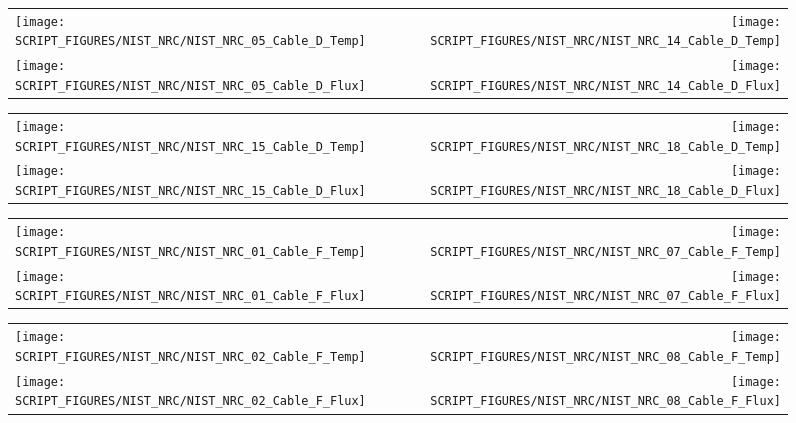 \begin{figure}[p]
\begin{tabular*}{\textwidth}{l@{\extracolsep{\fill}}r}
\texttt{[image: SCRIPT\_FIGURES/NIST\_NRC/NIST\_NRC\_05\_Cable\_D\_Temp]} &
\texttt{[image: SCRIPT\_FIGURES/NIST\_NRC/NIST\_NRC\_14\_Cable\_D\_Temp]} \\
\texttt{[image: SCRIPT\_FIGURES/NIST\_NRC/NIST\_NRC\_05\_Cable\_D\_Flux]} &
\texttt{[image: SCRIPT\_FIGURES/NIST\_NRC/NIST\_NRC\_14\_Cable\_D\_Flux]}
\end{tabular*}
\label{NIST_NRC_D_5_and_14}
\end{figure}

\clearpage

\begin{figure}[p]
\begin{tabular*}{\textwidth}{l@{\extracolsep{\fill}}r}
\texttt{[image: SCRIPT\_FIGURES/NIST\_NRC/NIST\_NRC\_15\_Cable\_D\_Temp]} &
\texttt{[image: SCRIPT\_FIGURES/NIST\_NRC/NIST\_NRC\_18\_Cable\_D\_Temp]} \\
\texttt{[image: SCRIPT\_FIGURES/NIST\_NRC/NIST\_NRC\_15\_Cable\_D\_Flux]} &
\texttt{[image: SCRIPT\_FIGURES/NIST\_NRC/NIST\_NRC\_18\_Cable\_D\_Flux]}
\end{tabular*}
\label{NIST_NRC_D_15_and_18}
\end{figure}

\clearpage

\begin{figure}[p]
\begin{tabular*}{\textwidth}{l@{\extracolsep{\fill}}r}
\texttt{[image: SCRIPT\_FIGURES/NIST\_NRC/NIST\_NRC\_01\_Cable\_F\_Temp]} &
\texttt{[image: SCRIPT\_FIGURES/NIST\_NRC/NIST\_NRC\_07\_Cable\_F\_Temp]} \\
\texttt{[image: SCRIPT\_FIGURES/NIST\_NRC/NIST\_NRC\_01\_Cable\_F\_Flux]} &
\texttt{[image: SCRIPT\_FIGURES/NIST\_NRC/NIST\_NRC\_07\_Cable\_F\_Flux]}
\end{tabular*}
\label{NIST_NRC_F_1_and_7}
\end{figure}

\begin{figure}[p]
\begin{tabular*}{\textwidth}{l@{\extracolsep{\fill}}r}
\texttt{[image: SCRIPT\_FIGURES/NIST\_NRC/NIST\_NRC\_02\_Cable\_F\_Temp]} &
\texttt{[image: SCRIPT\_FIGURES/NIST\_NRC/NIST\_NRC\_08\_Cable\_F\_Temp]} \\
\texttt{[image: SCRIPT\_FIGURES/NIST\_NRC/NIST\_NRC\_02\_Cable\_F\_Flux]} &
\texttt{[image: SCRIPT\_FIGURES/NIST\_NRC/NIST\_NRC\_08\_Cable\_F\_Flux]}
\end{tabular*}
\label{NIST_NRC_F_2_and_8}
\end{figure}

